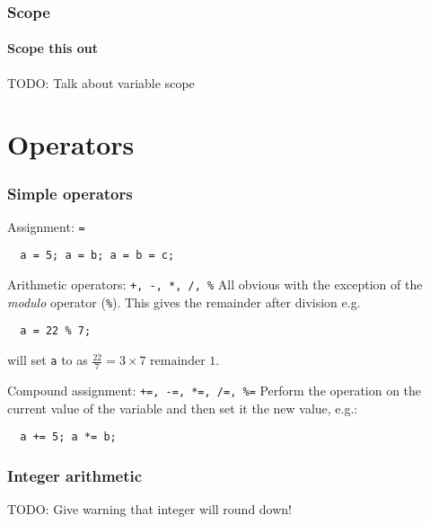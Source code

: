 \documentclass{beamer}
\begin{document}
\begin{frame}[fragile]
  \frametitle{Scope}
  \framesubtitle{Scope this out}
  
  TODO: Talk about variable scope
\end{frame}

\section{Operators}

\begin{frame}[fragile]
 \frametitle{Simple operators}
 \begin{block}{Assignment: \texttt{=}}
    \begin{lstlisting}
  a = 5; a = b; a = b = c; 
   \end{lstlisting}
  \end{block}
  \pause
  \begin{block}{Arithmetic operators: \texttt{+, -, *, /, \%}}
   All obvious with the exception of the \textit{modulo} operator (\texttt{\%}).  This gives the remainder after division e.g.
  \begin{lstlisting}
  a = 22 % 7;
  \end{lstlisting}
  will set \texttt{a} to  as $\frac{22}{7} = 3 \times 7 \text{ remainder } 1$.
 \end{block}
 \pause
 \begin{block}{Compound assignment: \texttt{+=, -=, *=, /=, \%=}}
  Perform the operation on the current value of the variable and then set it the new value, e.g.:
  \begin{lstlisting}
  a += 5; a *= b;
  \end{lstlisting}
 \end{block} %
\end{frame}


\begin{frame}[fragile]
  \frametitle{Integer arithmetic}
  
  TODO: Give warning that integer will round down!

\end{frame}
\end{document}
